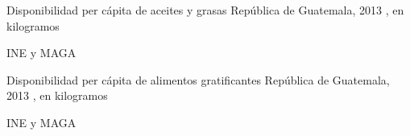 
%
{%
}%
{%
	Disponibilidad per cápita de aceites y grasas} %
{%
	República de Guatemala, 2013 , en kilogramos } %
{%
	\begin{tikzpicture}[x=1pt,y=1pt]    \end{tikzpicture}}%
{%
	INE y MAGA} %


%
{%
}%
{%
	Disponibilidad per cápita de alimentos gratificantes} %
{%
	República de Guatemala, 2013 , en kilogramos } %
{%
	\begin{tikzpicture}[x=1pt,y=1pt]    \end{tikzpicture}}%
{%
	INE y MAGA} %